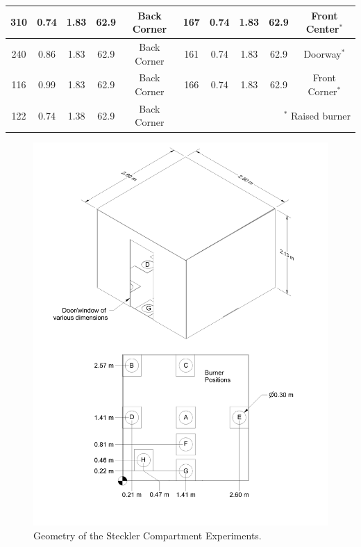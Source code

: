 \begin{table}[h!]
\begin{center}
\begin{tabular}{|c|c|c|c|c||c|c|c|c|c|}
310     & 0.74      & 1.83          &  62.9      & Back Corner  & 167   & 0.74      & 1.83        &  62.9         & Front Center$^*$    \\ \hline
240     & 0.86      & 1.83          &  62.9      & Back Corner  & 161   & 0.74      & 1.83        &  62.9         & Doorway$^*$         \\ \hline
116     & 0.99      & 1.83          &  62.9      & Back Corner  & 166   & 0.74      & 1.83        &  62.9         & Front Corner$^*$    \\ \hline
122     & 0.74      & 1.38          &  62.9      & Back Corner  &  \multicolumn{5}{r|}{$^*$ Raised burner}                   \\ \hline
\end{tabular}
\end{center}
\label{Steckler_Table}
\end{table}


\begin{figure}[p]
\includegraphics[width=\textwidth]{FIGURES/Steckler_Compartment/Steckler_Room_Drawing}
\caption{Geometry of the Steckler Compartment Experiments.}
\label{Steckler_ Drawing}
\end{figure}




